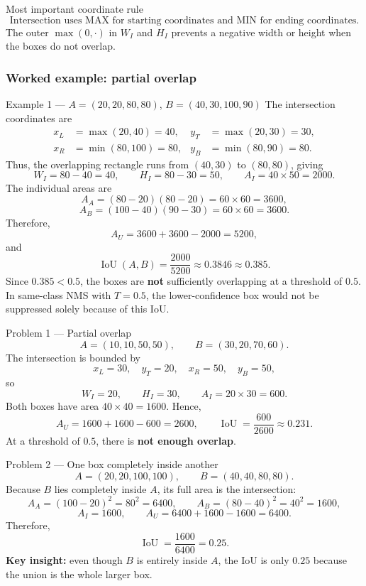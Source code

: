 \documentclass[11pt]{article}
\begin{document}
\begin{prioritybox}{Most important coordinate rule}
\[
\boxed{
\text{Intersection uses MAX for starting coordinates and MIN for ending coordinates.}
}
\]
The outer \(\max(0,\cdot)\) in \(W_I\) and \(H_I\) prevents a negative width or height when the boxes do not overlap.
\end{prioritybox}

\subsubsection{Worked example: partial overlap}

\begin{practicebox}{Example 1 --- \(A=(20,20,80,80)\), \(B=(40,30,100,90)\)}
The intersection coordinates are
\[
\begin{aligned}
x_L&=\max(20,40)=40, & y_T&=\max(20,30)=30,\\
x_R&=\min(80,100)=80, & y_B&=\min(80,90)=80.
\end{aligned}
\]
Thus, the overlapping rectangle runs from \((40,30)\) to \((80,80)\), giving
\[
W_I=80-40=40,
\qquad
H_I=80-30=50,
\qquad
\boxed{A_I=40\times50=2000}.
\]
The individual areas are
\[
A_A=(80-20)(80-20)=60\times60=3600,
\]
\[
A_B=(100-40)(90-30)=60\times60=3600.
\]
Therefore,
\[
A_U=3600+3600-2000=5200,
\]
and
\[
\boxed{
\operatorname{IoU}(A,B)=\frac{2000}{5200}\approx0.3846\approx0.385
}.
\]
Since \(0.385<0.5\), the boxes are \textbf{not} sufficiently overlapping at a threshold of \(0.5\). In same-class NMS with \(T=0.5\), the lower-confidence box would not be suppressed solely because of this IoU.
\end{practicebox}

\begin{practicebox}{Problem 1 --- Partial overlap}
\[
A=(10,10,50,50),
\qquad
B=(30,20,70,60).
\]
The intersection is bounded by
\[
x_L=30,\quad y_T=20,\quad x_R=50,\quad y_B=50,
\]
so
\[
W_I=20,\qquad H_I=30,
\qquad \boxed{A_I=20\times30=600}.
\]
Both boxes have area \(40\times40=1600\). Hence,
\[
A_U=1600+1600-600=2600,
\qquad
\boxed{\operatorname{IoU}=\frac{600}{2600}\approx0.231}.
\]
At a threshold of \(0.5\), there is \textbf{not enough overlap}.
\end{practicebox}

\begin{practicebox}{Problem 2 --- One box completely inside another}
\[
A=(20,20,100,100),
\qquad
B=(40,40,80,80).
\]
Because \(B\) lies completely inside \(A\), its full area is the intersection:
\[
A_A=(100-20)^2=80^2=6400,
\qquad
A_B=(80-40)^2=40^2=1600,
\]
\[
A_I=1600,
\qquad
A_U=6400+1600-1600=6400.
\]
Therefore,
\[
\boxed{\operatorname{IoU}=\frac{1600}{6400}=0.25}.
\]
\textbf{Key insight:} even though \(B\) is entirely inside \(A\), the IoU is only \(0.25\) because the union is the whole larger box.
\end{practicebox}
\end{document}
